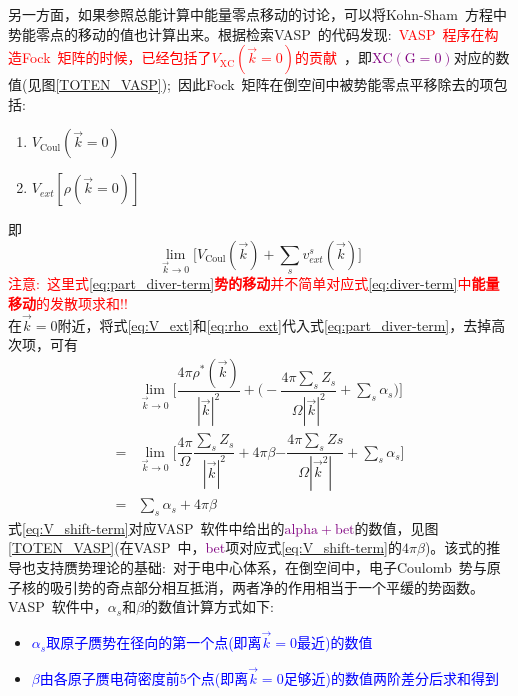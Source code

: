 \documentclass{article}      %
\begin{document}
另一方面，如果参照总能计算中能量零点移动的讨论，可以将\textrm{Kohn-Sham~}方程中势能零点的移动的值也计算出来。根据检索\textrm{VASP~}的代码发现:~\textcolor{red}{\textrm{VASP~}程序在构造\textrm{Fock~}矩阵的时候，已经包括了$V_{\mathrm{XC}}(\vec k=0)$的贡献~}，即\textcolor{purple}{$\mathrm{XC(G=0)}$}对应的数值(见图\ref{TOTEN_VASP});~因此\textrm{Fock~}矩阵在倒空间中被势能零点平移除去的项包括:~
\begin{enumerate}
	\item $V_{\mathrm{Coul}}(\vec k=0)$
	\item $V_{ext}[\rho(\vec k=0)]$
\end{enumerate}
即
\begin{equation}
	\lim_{\vec k\rightarrow0}\bigg[V_{\mathrm{Coul}}(\vec k)+\sum_sv_{ext}^s(\vec k)\bigg]
	\label{eq:part_diver-term}
\end{equation}
\textcolor{red}{注意:~这里式\eqref{eq:part_diver-term}\textbf{势的移动}并不简单对应式\eqref{eq:diver-term}中\textbf{能量移动}的发散项求和!!}\\
在$\vec k=0$附近，将式\eqref{eq:V_ext}和\eqref{eq:rho_ext}代入式\eqref{eq:part_diver-term}，去掉高次项，可有
\begin{equation}
	\begin{aligned}
		&\lim_{\vec k\rightarrow 0}\bigg[\dfrac{4\pi\rho^{\ast}(\vec k)}{|\vec k|^2}+\bigg(-\dfrac{4\pi\sum_sZ_s}{\Omega|\vec k|^2}+\sum_s\alpha_s\bigg)\bigg]\\
		=&\lim_{\vec k\rightarrow 0}\bigg[\boxed{\dfrac{4\pi}{\Omega}\dfrac{\sum_sZ_s}{|\vec k|^2}}+4\pi\beta\boxed{-\dfrac{4\pi\sum_sZs}{\Omega|\vec k^2|}}+\sum_s\alpha_s\bigg]\\
		=&\sum_s\alpha_s+4\pi\beta
	\end{aligned}
	\label{eq:V_shift-term}
\end{equation}
式\eqref{eq:V_shift-term}对应\textrm{VASP~}软件中给出的\textcolor{purple}{$\mathrm{alpha+bet}$}的数值，见图\ref{TOTEN_VASP}(在\textrm{VASP~}中，\textcolor{purple}{bet}项对应式\eqref{eq:V_shift-term}的$4\pi\beta$)。该式的推导也支持赝势理论的基础:~对于电中心体系，在倒空间中，电子\textrm{Coulomb~}势与原子核的吸引势的奇点部分相互抵消，两者净的作用相当于一个平缓的势函数。\textrm{VASP~}软件中，$\alpha_s$和$\beta$的数值计算方式如下:~
\begin{itemize}
	\item \textcolor{blue}{$\alpha_s$取原子赝势在径向的第一个点(即离$\vec k=0$最近)的数值}
	\item \textcolor{blue}{$\beta$由各原子赝电荷密度前5个点(即离$\vec k=0$足够近)的数值两阶差分后求和得到}
\end{itemize}
\end{document}
